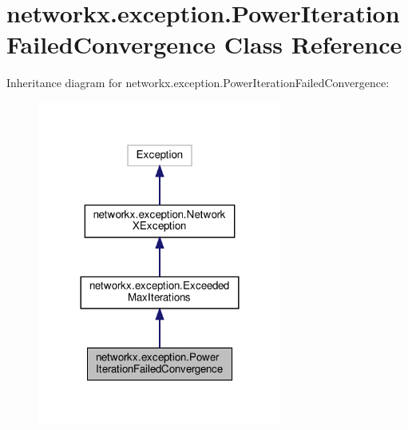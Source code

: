\hypertarget{classnetworkx_1_1exception_1_1PowerIterationFailedConvergence}{}\section{networkx.\+exception.\+Power\+Iteration\+Failed\+Convergence Class Reference}
\label{classnetworkx_1_1exception_1_1PowerIterationFailedConvergence}


Inheritance diagram for networkx.\+exception.\+Power\+Iteration\+Failed\+Convergence\+:
\nopagebreak
\begin{figure}[H]
\begin{center}
\leavevmode
\includegraphics[width=228pt]{classnetworkx_1_1exception_1_1PowerIterationFailedConvergence__inherit__graph}
\end{center}
\end{figure}


